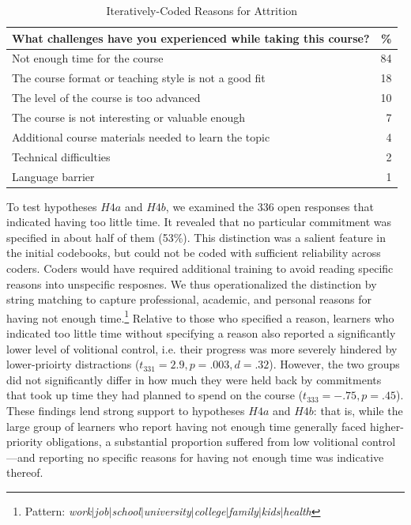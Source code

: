 \documentclass{sigchi}\usepackage[]{graphicx}\usepackage[]{color}
\begin{document}
\begin{table}[h!]
\caption{Iteratively-Coded Reasons for Attrition}
\label{tab:s2reas}
\small
\center
\begin{tabular}{lr}
\toprule
What challenges have you experienced while taking this course?  & \% \\
\midrule
Not enough time for the course & 84 \\
The course format or teaching style is not a good fit & 18 \\
The level of the course is too advanced & 10 \\
The course is not interesting or valuable enough & 7 \\
Additional course materials needed to learn the topic & 4 \\
Technical difficulties & 2 \\
Language barrier & 1 \\
\bottomrule
\end{tabular}
\end{table}

To test hypotheses $H4a$ and $H4b$, we examined the 336 open responses that indicated having too little time. It revealed that no particular commitment was specified in about half of them (53\%). This distinction was a salient feature in the initial codebooks, but could not be coded with sufficient reliability across coders. Coders would have required additional training to avoid reading specific reasons into unspecific resposnes. We thus operationalized the distinction by string matching to capture professional, academic, and personal reasons for having not enough time.\footnote{Pattern: {\em work$|$job$|$school$|$university$|$college$|$family$|$kids$|$health}} Relative to those who specified a reason, learners who indicated too little time without specifying a reason also reported a significantly lower level of volitional control, i.e. their progress was more severely hindered by lower-prioirty distractions ($t_{331}=2.9, p=.003, d=.32$). However, the two groups did not significantly differ in how much they were held back by commitments that took up time they had planned to spend on the course ($t_{333}=-.75, p=.45$). These findings lend strong support to hypotheses $H4a$ and $H4b$: that is, while the large group of learners who report having not enough time generally faced higher-priority obligations, a substantial proportion suffered from low volitional control---and reporting no specific reasons for having not enough time was indicative thereof.
\end{document}
